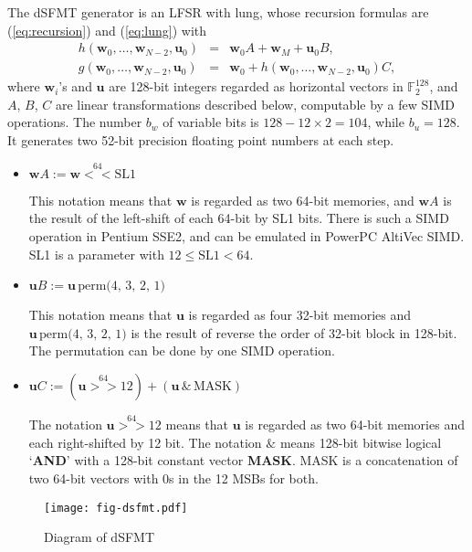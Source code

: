 \documentclass{svmult}
\begin{document}
The dSFMT generator is an LFSR with lung, whose recursion formulas are
(\ref{eq:recursion}) and (\ref{eq:lung}) with
\begin{eqnarray}
  h(\mathbf{w}_0, \ldots , \mathbf{w}_{N-2}, \mathbf{u}_0)
  &=& \mathbf{w}_{0}A + \mathbf{w}_{M} + \mathbf{u}_{0}B, \label{eq:dsfmt}
  \\
  g(\mathbf{w}_0, \ldots , \mathbf{w}_{N-2}, \mathbf{u}_0)
  &=& \mathbf{w}_{0} 
  + h(\mathbf{w}_0, \ldots , \mathbf{w}_{N-2}, \mathbf{u}_0)C, \label{eq:dsfmt-lung}
\end{eqnarray}
where $\mathbf{w}_i$'s and $\mathbf{u}$ are
128-bit integers regarded as horizontal vectors
in ${\mathbb F}_2^{128}$, and $A$, $B$, $C$ are linear transformations
described below, 
computable by a few SIMD operations. The number $b_w$ of variable bits
is $128-12\times 2=104$, while $b_u=128$. It generates two 52-bit
precision floating point numbers at each step.
\begin{itemize}
\item 
  $\mathbf{w} A := \mathbf{w} \stackrel{64}{<<} \textrm{SL1}$

  This notation means that $\mathbf{w}$ is regarded as two 
  64-bit memories, and $\mathbf{w} A$ is the result of the left-shift
  of each 64-bit by SL1 bits. There is such a SIMD operation in 
  Pentium SSE2, and can be emulated in PowerPC AltiVec SIMD.
  SL1 is a parameter with $12 \le \textrm{SL1} < 64$.

\item
  $\mathbf{u} B := \mathbf{u}\,\textrm{perm(4, 3, 2, 1)}$

  This notation means that $\mathbf{u}$ is regarded as four
  32-bit memories and $\mathbf{u}\,\textrm{perm(4, 3, 2, 1)}$ is
  the result of reverse the order of 32-bit block in 128-bit.
  The permutation can be done by one SIMD operation.

\item 
  $\mathbf{u} C := (\mathbf{u} \stackrel{64}{>>} 12) 
  + (\mathbf{u}\, \& \,\textrm{MASK})$

  The notation $\mathbf{u} \stackrel{64}{>>} 12$ means that
  $\mathbf{u}$ is regarded as two 64-bit memories and each
  right-shifted by 12 bit.  The notation $\&$ means 128-bit
  bitwise logical `\textbf{AND}' with a 128-bit constant vector \textbf{MASK}.
  MASK is a concatenation of two 64-bit vectors with 0s in the 12 MSBs 
  for both.

\end{itemize}

\begin{figure}
  \centering
  \texttt{[image: fig-dsfmt.pdf]}
  \caption{Diagram of dSFMT}
  \label{fig:dsfmt}
\end{figure}
\end{document}
